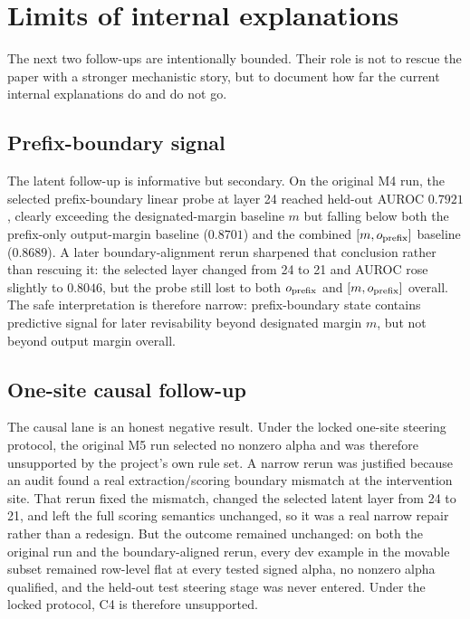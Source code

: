 \section{Limits of internal explanations}

The next two follow-ups are intentionally bounded. Their role is not to rescue the paper with a stronger mechanistic story, but to document how far the current internal explanations do and do not go.

\subsection{Prefix-boundary signal}

The latent follow-up is informative but secondary. On the original M4 run, the selected prefix-boundary linear probe at layer 24 reached held-out AUROC $0.7921$, clearly exceeding the designated-margin baseline $m$ but falling below both the prefix-only output-margin baseline ($0.8701$) and the combined $[m,o_{\mathrm{prefix}}]$ baseline ($0.8689$). A later boundary-alignment rerun sharpened that conclusion rather than rescuing it: the selected layer changed from 24 to 21 and AUROC rose slightly to $0.8046$, but the probe still lost to both $o_{\mathrm{prefix}}$ and $[m,o_{\mathrm{prefix}}]$ overall. The safe interpretation is therefore narrow: prefix-boundary state contains predictive signal for later revisability beyond designated margin $m$, but not beyond output margin overall.

\subsection{One-site causal follow-up}

The causal lane is an honest negative result. Under the locked one-site steering protocol, the original M5 run selected no nonzero alpha and was therefore unsupported by the project's own rule set. A narrow rerun was justified because an audit found a real extraction/scoring boundary mismatch at the intervention site. That rerun fixed the mismatch, changed the selected latent layer from 24 to 21, and left the full scoring semantics unchanged, so it was a real narrow repair rather than a redesign. But the outcome remained unchanged: on both the original run and the boundary-aligned rerun, every dev example in the movable subset remained row-level flat at every tested signed alpha, no nonzero alpha qualified, and the held-out test steering stage was never entered. Under the locked protocol, C4 is therefore unsupported.



